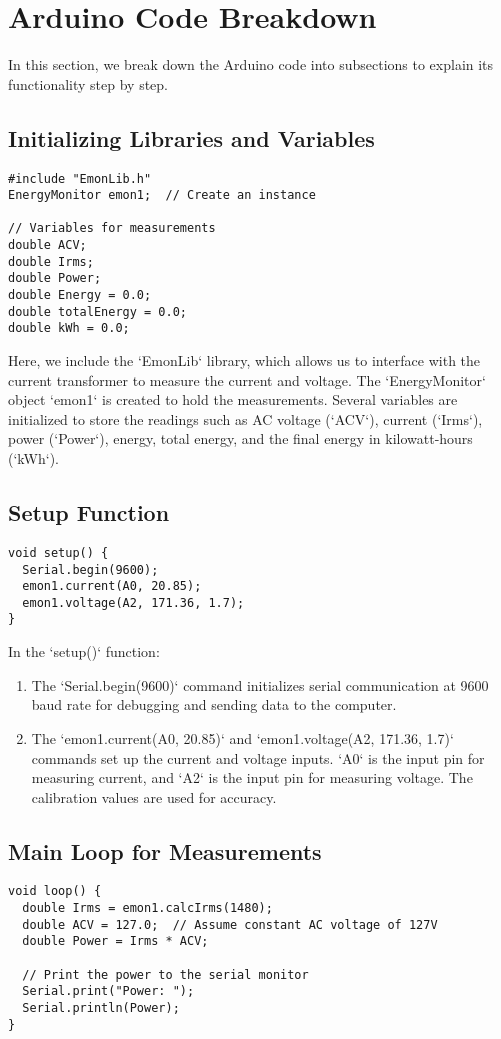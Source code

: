 \section{Arduino Code Breakdown}

In this section, we break down the Arduino code into subsections to explain its functionality step by step.

\subsection{Initializing Libraries and Variables}
\begin{lstlisting}[style=Arduino]
#include "EmonLib.h"
EnergyMonitor emon1;  // Create an instance

// Variables for measurements
double ACV;
double Irms;
double Power;
double Energy = 0.0;
double totalEnergy = 0.0;
double kWh = 0.0;
\end{lstlisting}

Here, we include the `EmonLib` library, which allows us to interface with the current transformer to measure the current and voltage. The `EnergyMonitor` object `emon1` is created to hold the measurements. Several variables are initialized to store the readings such as AC voltage (`ACV`), current (`Irms`), power (`Power`), energy, total energy, and the final energy in kilowatt-hours (`kWh`).

\subsection{Setup Function}
\begin{lstlisting}[style=Arduino]
void setup() {
  Serial.begin(9600);  
  emon1.current(A0, 20.85);  
  emon1.voltage(A2, 171.36, 1.7);  
}
\end{lstlisting}

In the `setup()` function:
\begin{enumerate}
    \item The `Serial.begin(9600)` command initializes serial communication at 9600 baud rate for debugging and sending data to the computer.
    \item The `emon1.current(A0, 20.85)` and `emon1.voltage(A2, 171.36, 1.7)` commands set up the current and voltage inputs. `A0` is the input pin for measuring current, and `A2` is the input pin for measuring voltage. The calibration values are used for accuracy.
\end{enumerate}


\subsection{Main Loop for Measurements}
\begin{lstlisting}[style=Arduino]
void loop() {
  double Irms = emon1.calcIrms(1480); 
  double ACV = 127.0;  // Assume constant AC voltage of 127V
  double Power = Irms * ACV; 
  
  // Print the power to the serial monitor
  Serial.print("Power: ");
  Serial.println(Power);
}
\end{lstlisting}

